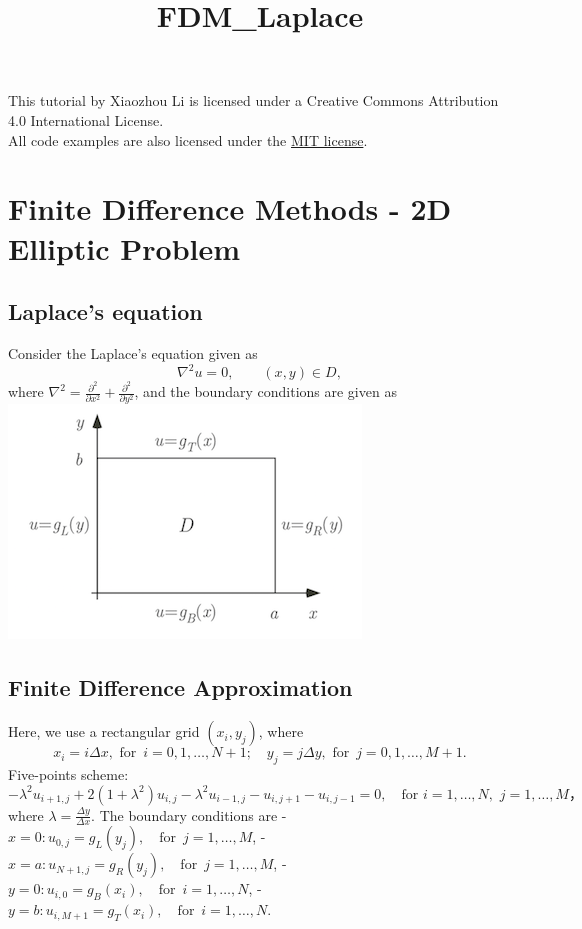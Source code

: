 \documentclass[11pt]{article}
\title{FDM\_Laplace}
\makeatletter
\def\maxwidth{\ifdim\Gin@nat@width>\linewidth\linewidth
    \else\Gin@nat@width\fi}
\let\Oldincludegraphics\includegraphics
\renewcommand{\includegraphics}[1]{\Oldincludegraphics[width=.8\maxwidth]{#1}}
\makeatother
\begin{document}
    
    
    \maketitle
    
    

    
    This tutorial by Xiaozhou Li is licensed under a Creative Commons
Attribution 4.0 International License.\\
All code examples are also licensed under the
\href{http://opensource.org/licenses/MIT}{MIT license}.

    \section{Finite Difference Methods - 2D Elliptic
Problem}\label{finite-difference-methods---2d-elliptic-problem}

    \subsection{Laplace's equation}\label{laplaces-equation}

Consider the Laplace's equation given as \[
    \nabla^2 u = 0,\quad\quad (x,y) \in D,
\] where
\(\nabla^2 = \frac{\partial^2}{\partial x^2} + \frac{\partial^2}{\partial y^2}\),
and the boundary conditions are given as \includegraphics{img/BCs.png}

    \subsection{Finite Difference
Approximation}\label{finite-difference-approximation}

Here, we use a rectangular grid \((x_i,y_j)\), where \[
    x_i = i\Delta x, \,\,\text{for }\, i = 0,1,\ldots,N+1;\quad y_j = j\Delta y,\,\,\text{for }\, j = 0,1,\ldots,M+1.
\] Five-points scheme: \[
    -\lambda^2 u_{i+1,j} + 2(1+\lambda^2)u_{i,j} - \lambda^2u_{i-1,j} - u_{i,j+1} - u_{i,j-1} = 0,\quad\text{for}\,\, i = 1,\ldots,N,\,\, j = 1,\ldots,M，
\] where \(\lambda = \frac{\Delta y}{\Delta x}\). The boundary
conditions are -
\(x = 0: u_{0,j} = g_L(y_j), \quad\text{for }\, j = 1,\ldots,M\), -
\(x = a: u_{N+1,j} = g_R(y_j), \quad\text{for }\, j = 1,\ldots,M\), -
\(y = 0: u_{i,0} = g_B(x_i), \quad\text{for }\, i = 1,\ldots,N\), -
\(y = b: u_{i,M+1} = g_T(x_i), \quad\text{for }\, i = 1,\ldots,N\).
\end{document}

